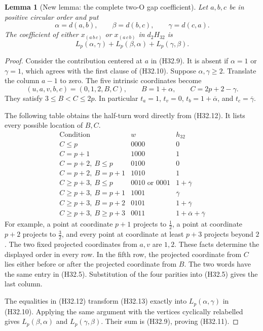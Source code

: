 \documentclass[11pt,oneside]{report}
\newtheorem{lemma}[theorem]{Lemma}
\theoremstyle{definition}
\numberwithin{equation}{section}
\begin{document}
\begin{lemma}[New lemma: the complete two-O gap coefficient]
\label{J21:lem:h32-two-O-gap}
Let $a,b,c$ be in positive circular order and put
\[
 \alpha=d(a,b),\qquad
 \beta=d(b,c),\qquad
 \gamma=d(c,a).
\]
The coefficient of either $x_{(a\,b\,c)}$ or $x_{(a\,c\,b)}$
in $d_2H_{32}$ is
\[
 L_p(\alpha,\gamma)+L_p(\beta,\alpha)+L_p(\gamma,\beta).
 \tag{H32.11}
\]
\end{lemma}
\begin{proof}
Consider the contribution centered at $a$ in (H32.9).
It is absent if $\alpha=1$ or $\gamma=1$, which agrees with
the first clause of (H32.10).
Suppose $\alpha,\gamma\geq2$.
Translate the column $a-1$ to zero.
The five intrinsic coordinates become
\[
       (u,a,v,b,c)=(0,1,2,B,C),\qquad
       B=1+\alpha,\qquad C=2p+2-\gamma.
 \tag{H32.12}
\]
They satisfy $3\leq B<C\leq2p$.
In particular $t_a=1$, $t_v=0$,
$t_b=1+\overline{\alpha}$, and
$t_c=\overline{\gamma}$.

The following table obtains the half-turn word directly from
(H32.12). It lists every possible location of $B,C$.
\[
\begin{array}{c|c|c}
 \text{Condition}&w&h_{32}\\ \hline
 C\leq p&0000&0\\
 C=p+1&1000&1\\
 C=p+2,\ B\leq p&0100&0\\
 C=p+2,\ B=p+1&1010&1\\
 C\geq p+3,\ B\leq p&0010\text{ or }0001&1+\overline{\gamma}\\
 C\geq p+3,\ B=p+1&1001&\overline{\gamma}\\
 C\geq p+3,\ B=p+2&0101&1+\overline{\gamma}\\
 C\geq p+3,\ B\geq p+3&0011&
                         1+\overline{\alpha}+\overline{\gamma}
\end{array}
 \tag{H32.13}
\]
For example, a point at coordinate $p+1$ projects to $\tfrac12$,
a point at coordinate $p+2$ projects to $\tfrac32$, and every point
at coordinate at least $p+3$ projects beyond $2$.
The two fixed projected coordinates from $a,v$ are $1,2$.
These facts determine the displayed order in every row.
In the fifth row, the projected coordinate from $C$ lies either before
or after the projected coordinate from $B$.
The two words have the same entry in (H32.5).
Substitution of the four parities into (H32.5) gives the last column.

The equalities in (H32.12) transform (H32.13) exactly into
$L_p(\alpha,\gamma)$ in (H32.10).
Applying the same argument with the vertices cyclically relabelled
gives $L_p(\beta,\alpha)$ and $L_p(\gamma,\beta)$.
Their sum is (H32.9), proving (H32.11).
\end{proof}
\end{document}
